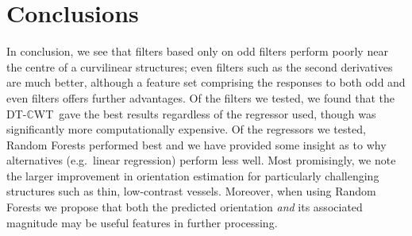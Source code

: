 \documentclass[runningheads,a4paper]{llncs}
\def\dtcwt{DT-$\mathbb{C}$WT}
\def\figpath{./figs}
\def\eg{e.g.}
\newcommand{\comment}[1]{}
\begin{document}


%



\section{Conclusions}
\label{s:conclusions}
In conclusion, we see that filters based only on odd filters perform poorly near the centre of a curvilinear structures; even filters such as the second derivatives are much better, although a feature set comprising the responses to both odd and even filters offers further advantages. Of the filters we tested, we found that the \dtcwt~gave the best results regardless of the regressor used, though was significantly more computationally expensive. Of the regressors we tested, Random Forests performed best and we have provided some insight as to why alternatives (\eg~linear regression) perform less well. Most promisingly, we note the larger improvement in orientation estimation for particularly challenging structures such as thin, low-contrast vessels. Moreover, when using Random Forests we propose that both the predicted orientation \emph{and} its associated magnitude may be useful features in further processing. \comment{We must, however, take care when building regressors for orientation prediction in order to ensure that angles wrap around the circle correctly.}




\end{document}
